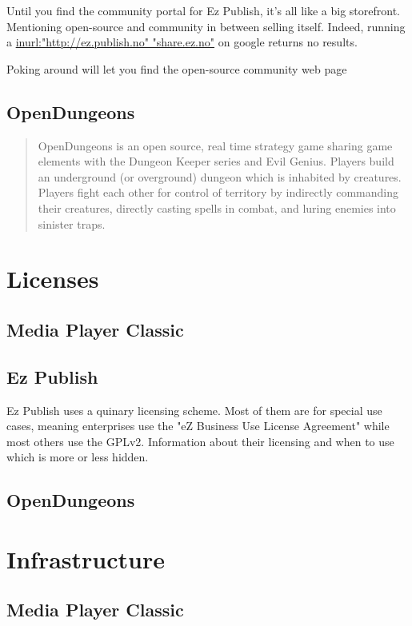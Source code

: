 \documentclass{report} %
\begin{document}
Until you find the community portal for Ez Publish, it's all like a big storefront. Mentioning open-source and community in between selling itself. Indeed, running a \url{inurl:"http://ez.publish.no" "share.ez.no"} on google returns no results.

Poking around will let you find the open-source community web page\cite{ezcomweb}

\subsection{OpenDungeons}
\begin{quotation}
OpenDungeons is an open source, real time strategy game sharing game elements with the Dungeon Keeper series and Evil Genius. Players build an underground (or overground) dungeon which is inhabited by creatures. Players fight each other for control of territory by indirectly commanding their creatures, directly casting spells in combat, and luring enemies into sinister traps.\cite{odwebabout}
\end{quotation}


\section{Licenses}
\subsection{Media Player Classic}
\subsection{Ez Publish}
Ez Publish uses a quinary licensing scheme\cite{ezpubweblicenses}. Most of them are for special use cases, meaning enterprises use the "eZ Business Use License Agreement" while most others use the GPLv2\cite{gplv2}. Information about their licensing and when to use which is more or less hidden.
\subsection{OpenDungeons}

\section{Infrastructure}
\subsection{Media Player Classic}
\end{document}
